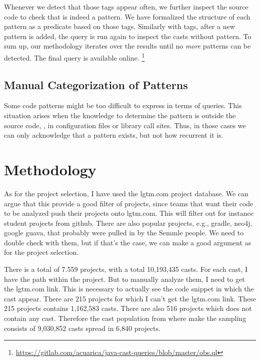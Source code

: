 Whenever we detect that those tags appear often,
we further inspect the source code to check that is indeed a pattern.
We have formalized the structure of each pattern as a \ql{} predicate based on those tags.
Similarly with tags, after a new pattern is added,
the query is run again to inspect the casts without pattern.
To sum up, our methodology iterates over the results until
no \emph{more} patterns can be detected.
The final \ql{} query is available online.%
\footnote{\url{https://gitlab.com/acuarica/java-cast-queries/blob/master/obs.ql}}


\subsection*{Manual Categorization of Patterns}

Some code patterns might be too difficult to
express in terms of \ql{} queries.
This situation arises when the knowledge to determine
the pattern is outside the source code,
\eg, in configuration files or library call sites.
Thus, in those cases we can only acknowledge that a pattern exists,
but not how recurrent it is.

% 



\section{Methodology}

As for the project selection, I have used the lgtm.com project database.
We can argue that this provide a good filter of projects,
since teams that want their code to be analyzed push their projects onto lgtm.com.
This will filter out for instance student projects from github.
There are also popular projects, e.g., gradle, neo4j, google guava,
that probably were pulled in by the Semmle people.
We need to double check with them, but if that’s the case,
we can make a good argument as for the project selection.

There is a total of 7.559 projects, with a total 10,193,435 casts.
For each cast, I have the path within the project.
But to manually analyze them, I need to get the lgtm.com link.
This is necessary to actually see the code snippet in which the cast appear.
There are 215 projects for which I can’t get the lgtm.com link.
These 215 projects contains 1,162,583 casts.
There are also 516 projects which does not contain any cast.
Therefore the cast population from where make the sampling consists of
9,030,852 casts spread in 6,840 projects.

